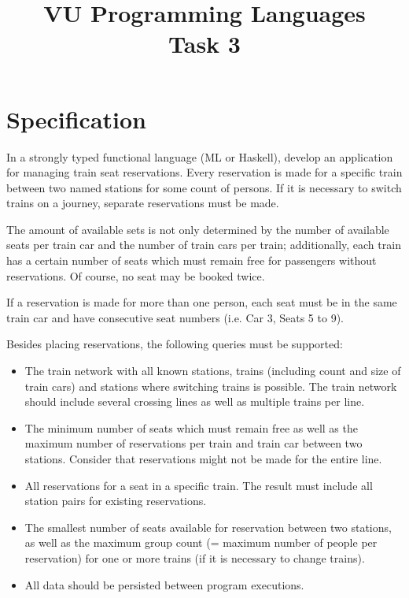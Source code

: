 \documentclass[a4paper,10pt]{article}
\title{VU Programming Languages \\
       Task 3}
\begin{document}
\maketitle

\section{Specification}

In a strongly typed functional language (ML or Haskell), develop
an application for managing train seat reservations. Every
reservation is made for a specific train between two named stations
for some count of persons.
If it is necessary to switch trains on a journey, separate reservations
must be made.

The amount of available sets is not only determined by the number
of available seats per train car and the number of train cars per train;
additionally, each train has a certain number of seats which must
remain free for passengers without reservations.
Of course, no seat may be booked twice.

If a reservation is made for more than one person, each seat must
be in the same train car and have consecutive seat numbers (i.e. Car 3,
Seats 5 to 9).

Besides placing reservations, the following queries must be supported:

\begin{itemize}
\item The train network with all known stations, trains (including
    count and size of train cars) and stations where switching trains
    is possible. The train network should include several crossing
    lines as well as multiple trains per line.
\item The minimum number of seats which must remain free as well
    as the maximum number of reservations per train and train car between
    two stations. Consider that reservations might not be made
    for the entire line.
\item All reservations for a seat in a specific train. The result must
    include all station pairs for existing reservations.
\item The smallest number of seats available for reservation between
    two stations, as well as the maximum group count (= maximum
    number of people per reservation) for one or more trains (if
    it is necessary to change trains).
\item All data should be persisted between program executions.
\end{itemize}
\end{document}
